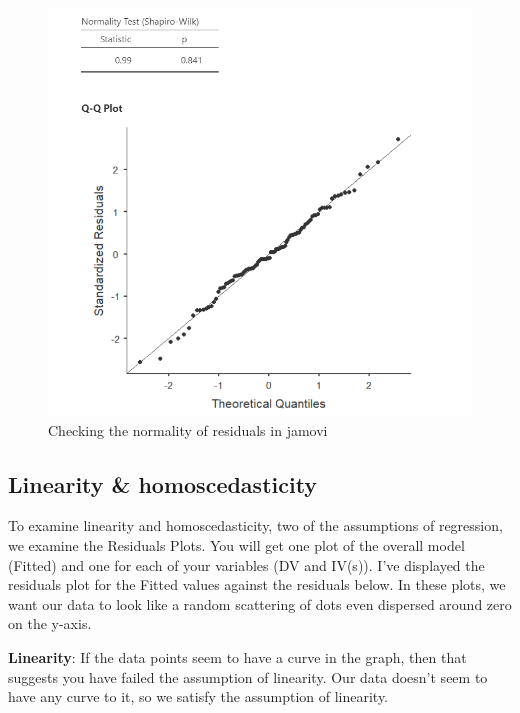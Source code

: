 \documentclass[
]{book}
\begin{document}
\begin{figure}

{\centering \includegraphics[width=1\linewidth]{images/13-regression/regression-normality} 

}

\caption{Checking the normality of residuals in jamovi}\label{fig:unnamed-chunk-7}
\end{figure}

\hypertarget{linearity-homoscedasticity}{%
\subsection{Linearity \& homoscedasticity}\label{linearity-homoscedasticity}}

To examine linearity and homoscedasticity, two of the assumptions of regression, we examine the Residuals Plots. You will get one plot of the overall model (Fitted) and one for each of your variables (DV and IV(s)). I've displayed the residuals plot for the Fitted values against the residuals below. In these plots, we want our data to look like a random scattering of dots even dispersed around zero on the y-axis.

\textbf{Linearity}: If the data points seem to have a curve in the graph, then that suggests you have failed the assumption of linearity. Our data doesn't seem to have any curve to it, so we satisfy the assumption of linearity.
\end{document}
